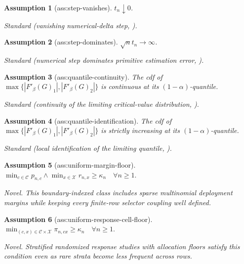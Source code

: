 \documentclass{article}
\newtheorem{assumption}{Assumption}
\begin{document}
\begin{assumption}[ass:step-vanishes]\label{ass:step-vanishes}
\(t_n\downarrow0\).
\par\smallskip\noindent\emph{Standard} (vanishing numerical-delta step, \cite{HongLi2018NumericalDelta}).
\end{assumption}

\begin{assumption}[ass:step-dominates]\label{ass:step-dominates}
\(\sqrt n t_n\to\infty\).
\par\smallskip\noindent\emph{Standard} (numerical step dominates primitive estimation error, \cite{HongLi2018NumericalDelta}).
\end{assumption}

\begin{assumption}[ass:quantile-continuity]\label{ass:quantile-continuity}
The cdf of \(\max\{|F'_\beta(G)_1|,|F'_\beta(G)_2|\}\) is continuous at its \((1-\alpha)\)-quantile.
\par\smallskip\noindent\emph{Standard} (continuity of the limiting critical-value distribution, \cite{HongLi2018NumericalDelta}).
\end{assumption}

\begin{assumption}[ass:quantile-identification]\label{ass:quantile-identification}
The cdf of \(\max\{|F'_\beta(G)_1|,|F'_\beta(G)_2|\}\) is strictly increasing at its \((1-\alpha)\)-quantile.
\par\smallskip\noindent\emph{Standard} (local identification of the limiting quantile, \cite{HongLi2018NumericalDelta}).
\end{assumption}

\begin{assumption}[ass:uniform-margin-floor]\label{ass:uniform-margin-floor}
\(\min_{c\in\mathcal C}p_{n,c}\wedge\min_{x\in\mathcal X}r_{n,x}\ge\kappa_n\quad\forall n\ge1.\)
\par\smallskip\noindent\emph{Novel.} This boundary-indexed class includes sparse multinomial deployment margins while keeping every finite-row selector coupling well defined.
\end{assumption}

\begin{assumption}[ass:uniform-response-cell-floor]\label{ass:uniform-response-cell-floor}
\(\min_{(c,x)\in\mathcal C\times\mathcal X}\pi_{n,cx}\ge\kappa_n\quad\forall n\ge1.\)
\par\smallskip\noindent\emph{Novel.} Stratified randomized response studies with allocation floors satisfy this condition even as rare strata become less frequent across rows.
\end{assumption}
\end{document}
